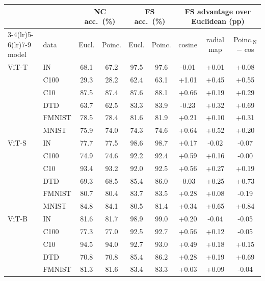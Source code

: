\begin{table}[H]
\centering
\scriptsize
\setlength{\tabcolsep}{2.6pt}
\begingroup
\scriptsize\renewcommand{\arraystretch}{0.88}
\setlength{\tabcolsep}{3pt}
\begin{tabular}{llccccccc}
\toprule
 & & \multicolumn{2}{c}{NC acc.\ (\%)} & \multicolumn{2}{c}{FS acc.\ (\%)} & \multicolumn{3}{c}{FS advantage over Euclidean (pp)} \\
\cmidrule(lr){3-4}\cmidrule(lr){5-6}\cmidrule(lr){7-9}
model & data & Eucl. & Poinc. & Eucl. & Poinc. & cosine & radial map & Poinc.$_{\text{N}}$ $-$ cos \\
\midrule
ViT-T & IN & 68.1 & 67.2 & 97.5 & 97.6 & -0.01 & +0.01 & +0.08 \\
 & C100 & 29.3 & 28.2 & 62.4 & 63.1 & +1.01 & +0.45 & +0.55 \\
 & C10 & 87.5 & 87.4 & 87.6 & 88.1 & +0.66 & +0.19 & +0.29 \\
 & DTD & 63.7 & 62.5 & 83.3 & 83.9 & -0.23 & +0.32 & +0.69 \\
 & FMNIST & 78.5 & 78.4 & 81.6 & 81.9 & +0.21 & +0.10 & +0.31 \\
 & MNIST & 75.9 & 74.0 & 74.3 & 74.6 & +0.64 & +0.52 & +0.20 \\
\midrule
ViT-S & IN & 77.7 & 77.5 & 98.6 & 98.7 & +0.17 & -0.02 & -0.07 \\
 & C100 & 74.9 & 74.6 & 92.2 & 92.4 & +0.59 & +0.16 & -0.00 \\
 & C10 & 93.4 & 93.2 & 92.0 & 92.5 & +0.56 & +0.27 & +0.19 \\
 & DTD & 69.3 & 68.5 & 85.4 & 86.0 & -0.03 & +0.25 & +0.73 \\
 & FMNIST & 80.7 & 80.4 & 83.7 & 83.5 & +0.28 & +0.08 & -0.19 \\
 & MNIST & 84.8 & 84.1 & 80.5 & 81.4 & +0.34 & +0.65 & +0.84 \\
\midrule
ViT-B & IN & 81.6 & 81.7 & 98.9 & 99.0 & +0.20 & -0.04 & -0.05 \\
 & C100 & 77.3 & 77.0 & 92.5 & 92.7 & +0.56 & +0.12 & -0.05 \\
 & C10 & 94.5 & 94.0 & 92.7 & 93.0 & +0.49 & +0.18 & +0.15 \\
 & DTD & 70.8 & 70.8 & 85.4 & 86.2 & +0.28 & +0.19 & +0.69 \\
 & FMNIST & 81.3 & 81.6 & 83.4 & 83.3 & +0.03 & +0.09 & -0.04 \\

\end{tabular}
\end{table}
